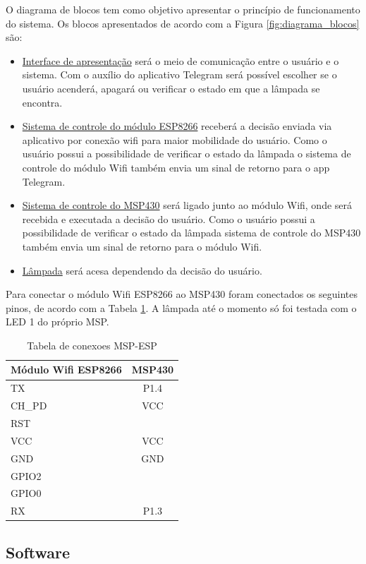 \documentclass[12pt,journal,compsoc]{IEEEtran}
\begin{document}
O diagrama de blocos tem como objetivo apresentar o princípio de funcionamento do sistema. Os blocos apresentados de acordo com a Figura \ref{fig:diagrama_blocos} são:


\begin{itemize}
\item \underline{Interface de apresentação} será o meio de comunicação entre o usuário e o sistema. Com o auxílio do aplicativo Telegram será possível escolher se o usuário acenderá, apagará ou verificar o estado em que a lâmpada se encontra.
\item \underline{Sistema de controle do módulo ESP8266} receberá a decisão enviada via aplicativo por conexão wifi para maior mobilidade do usuário. Como o usuário possui a possibilidade de verificar o estado da lâmpada o sistema de controle do módulo Wifi também envia um sinal de retorno para o app Telegram.
\item \underline{Sistema de controle do MSP430} será ligado junto ao módulo Wifi, onde será recebida e executada a decisão do usuário. Como o usuário possui a possibilidade de verificar o estado da lâmpada sistema de controle do MSP430 também envia um sinal de retorno para o módulo Wifi.
\item \underline{Lâmpada} será acesa dependendo da decisão do usuário.
\end{itemize}

Para conectar o módulo Wifi ESP8266 ao MSP430 foram conectados os seguintes pinos, de acordo com a Tabela \ref{tab:conexoes}. A lâmpada até o momento só foi testada com o LED 1 do próprio MSP.

\begin{table}[h!]
\centering
\caption{Tabela de conexoes MSP-ESP}
\label{tab:conexoes}
\begin{tabular}{|l|c|}
\hline
Módulo Wifi ESP8266 & MSP430 \\ \hline
TX & P1.4 \\ \hline
CH\_PD & VCC \\ \hline
RST &  \\ \hline
VCC & VCC \\ \hline
GND & GND \\ \hline
GPIO2 & \\ \hline
GPIO0 & \\ \hline
RX & P1.3 \\ \hline
\end{tabular}
\end{table}

\subsection{Software}
\end{document}
